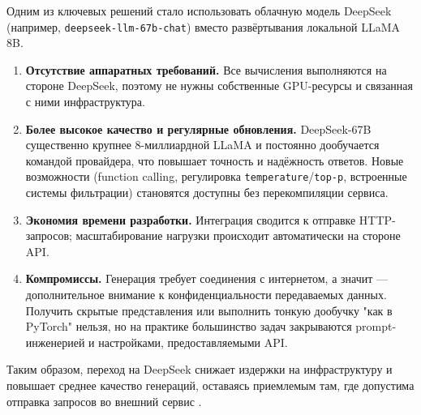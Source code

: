 Одним из ключевых решений стало использовать облачную модель DeepSeek (например, \texttt{deepseek-llm-67b-chat}) вместо развёртывания локальной LLaMA 8B.

\begin{enumerate}[label=\arabic*]
  \item \textbf{Отсутствие аппаратных требований.} 
        Все вычисления выполняются на стороне DeepSeek, поэтому не нужны собственные GPU-ресурсы и связанная с ними инфраструктура.

  \item \textbf{Более высокое качество и регулярные обновления.} 
        DeepSeek-67B существенно крупнее 8-миллиардной LLaMA и постоянно дообучается командой провайдера, что повышает точность и надёжность ответов. 
        Новые возможности (function calling, регулировка \texttt{temperature}/\texttt{top-p}, встроенные системы фильтрации) становятся доступны без перекомпиляции сервиса.

  \item \textbf{Экономия времени разработки.} 
        Интеграция сводится к отправке HTTP-запросов; масштабирование нагрузки происходит автоматически на стороне API.

  \item \textbf{Компромиссы.} 
        Генерация требует соединения с интернетом, а значит — дополнительное внимание к конфиденциальности передаваемых данных. 
        Получить скрытые представления или выполнить тонкую дообучку "как в PyTorch" нельзя, но на практике большинство задач закрываются prompt-инженерией и настройками, предоставляемыми API.
\end{enumerate}

Таким образом, переход на DeepSeek снижает издержки на инфраструктуру и повышает среднее качество генераций, оставаясь приемлемым там, где допустима отправка запросов во внешний сервис \cite{deepseek:docs}.

